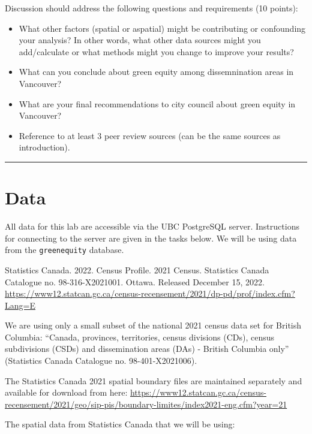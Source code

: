 \documentclass[
]{book}
\begin{document}
Discussion should address the following questions and requirements (10 points):

\begin{itemize}
\item
  What other factors (spatial or aspatial) might be contributing or confounding your analysis? In other words, what other data sources might you add/calculate or what methods might you change to improve your results?
\item
  What can you conclude about green equity among dissemnination areas in Vancouver?
\item
  What are your final recommendations to city council about green equity in Vancouver?
\item
  Reference to at least 3 peer review sources (can be the same sources as introduction).
\end{itemize}

\begin{center}\rule{0.5\linewidth}{0.5pt}\end{center}

\hypertarget{data}{%
\section*{Data}\label{data}}

All data for this lab are accessible via the UBC PostgreSQL server. Instructions for connecting to the server are given in the tasks below. We will be using data from the \texttt{greenequity} database.

Statistics Canada. 2022. Census Profile. 2021 Census. Statistics Canada Catalogue no. 98-316-X2021001. Ottawa. Released December 15, 2022. \url{https://www12.statcan.gc.ca/census-recensement/2021/dp-pd/prof/index.cfm?Lang=E}

We are using only a small subset of the national 2021 census data set for British Columbia: ``Canada, provinces, territories, census divisions (CDs), census subdivisions (CSDs) and dissemination areas (DAs) - British Columbia only'' (Statistics Canada Catalogue no. 98-401-X2021006).

The Statistics Canada 2021 spatial boundary files are maintained separately and available for download from here: \url{https://www12.statcan.gc.ca/census-recensement/2021/geo/sip-pis/boundary-limites/index2021-eng.cfm?year=21}

The spatial data from Statistics Canada that we will be using:
\end{document}
